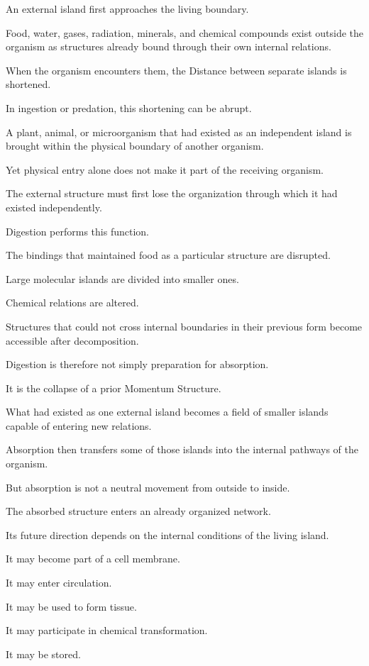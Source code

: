 An external island first approaches the living boundary.

Food, water, gases, radiation, minerals, and chemical compounds exist outside the organism as structures already bound through their own internal relations.

When the organism encounters them, the Distance between separate islands is shortened.

In ingestion or predation, this shortening can be abrupt.

A plant, animal, or microorganism that had existed as an independent island is brought within the physical boundary of another organism.

Yet physical entry alone does not make it part of the receiving organism.

The external structure must first lose the organization through which it had existed independently.

Digestion performs this function.

The bindings that maintained food as a particular structure are disrupted.

Large molecular islands are divided into smaller ones.

Chemical relations are altered.

Structures that could not cross internal boundaries in their previous form become accessible after decomposition.

Digestion is therefore not simply preparation for absorption.

It is the collapse of a prior Momentum Structure.

What had existed as one external island becomes a field of smaller islands capable of entering new relations.

Absorption then transfers some of those islands into the internal pathways of the organism.

But absorption is not a neutral movement from outside to inside.

The absorbed structure enters an already organized network.

Its future direction depends on the internal conditions of the living island.

It may become part of a cell membrane.

It may enter circulation.

It may be used to form tissue.

It may participate in chemical transformation.

It may be stored.

